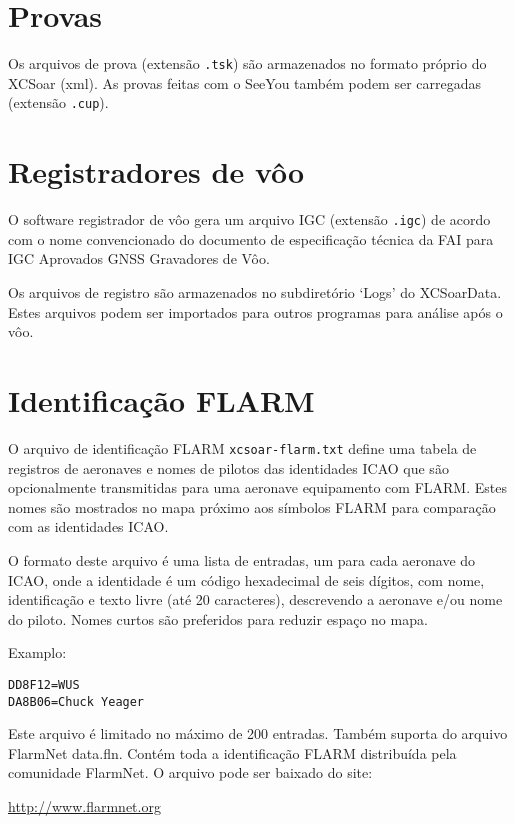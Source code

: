 \section{Provas}

Os arquivos de prova (extensão \verb|.tsk|) são armazenados no formato próprio do XCSoar (xml).  As provas feitas com o SeeYou também podem ser carregadas (extensão \verb|.cup|).

\section{Registradores de vôo} \label{sec:logfiles}

O software registrador de vôo gera um arquivo IGC (extensão  \verb|.igc|) de acordo com o nome convencionado do documento de especificação técnica da FAI para IGC Aprovados GNSS Gravadores de Vôo.

Os arquivos de registro são armazenados no subdiretório ‘Logs’ do XCSoarData.  Estes arquivos podem ser importados para outros programas para análise após o vôo.


\section{Identificação FLARM}\label{sec:flarm-ident-file}

O arquivo de identificação FLARM \verb|xcsoar-flarm.txt| define uma tabela de registros de aeronaves e nomes de pilotos das identidades ICAO que são opcionalmente transmitidas para uma aeronave equipamento com FLARM.  Estes nomes são mostrados no mapa próximo aos símbolos FLARM para comparação com as identidades ICAO.

O formato deste arquivo é uma lista de entradas, um para cada aeronave do ICAO, onde a identidade é um código hexadecimal de seis dígitos, com nome, identificação e texto livre (até 20 caracteres), descrevendo a aeronave e/ou nome do piloto.  Nomes curtos são preferidos para reduzir espaço no mapa.

Examplo:
\begin{verbatim}
DD8F12=WUS
DA8B06=Chuck Yeager
\end{verbatim}

Este arquivo é limitado no máximo de 200 entradas.  Também suporta do arquivo FlarmNet data.fln.  Contém toda a identificação FLARM distribuída pela comunidade FlarmNet.  O arquivo pode ser baixado do site:

\url{http://www.flarmnet.org}

